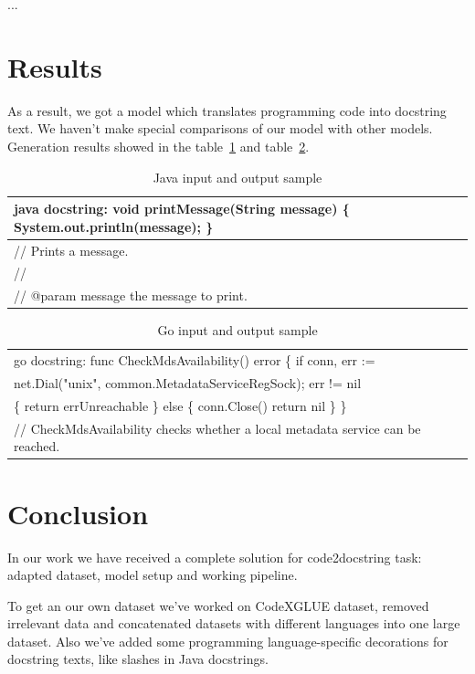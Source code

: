 \documentclass{article}
\begin{document}
...

\section{Results}

As a result, we got a model which translates programming code into docstring text. We haven't make special comparisons of our model with other models. Generation results showed in the {table}~\ref{tab:output1} and {table}~\ref{tab:output2}.

\begin{table}[!tbh]
    \centering
    \begin{tabular}{|l|}
\hline
java docstring: void printMessage(String message) \{ System.out.println(message); \}\\
\hline
// Prints a message.\\
//\\
// @param message the message to print.
\\
\hline
    \end{tabular}
    \caption{Java input and output sample}
    \label{tab:output1}
\end{table}

\begin{table}[!tbh]
    \centering
    \begin{tabular}{|l|}
\hline
go docstring: func CheckMdsAvailability() error \{ if conn, err :=\\net.Dial("unix", common.MetadataServiceRegSock); err != nil\\\{ return errUnreachable \} else \{ conn.Close() return nil \} \}\\
\hline
// CheckMdsAvailability checks whether a local metadata service can be reached.
\\
\hline
    \end{tabular}
    \caption{Go input and output sample}
    \label{tab:output2}
\end{table}

\section{Conclusion}

In our work we have received a complete solution for code2docstring task: adapted dataset, model setup and working pipeline.

To get an our own dataset we've worked on CodeXGLUE dataset, removed irrelevant data and concatenated datasets with different languages into one large dataset. Also we've added some programming language-specific decorations for docstring texts, like slashes in Java docstrings.
\end{document}
